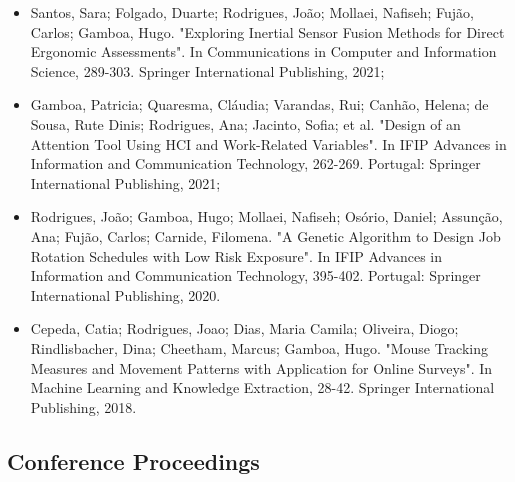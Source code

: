 \begin{itemize}
\item Santos, Sara; Folgado, Duarte; Rodrigues, João; Mollaei, Nafiseh; Fujão, Carlos; Gamboa, Hugo. "Exploring Inertial Sensor Fusion Methods for Direct Ergonomic Assessments". In Communications in Computer and Information Science, 289-303. Springer International Publishing, 2021;

\item Gamboa, Patricia; Quaresma, Cláudia; Varandas, Rui; Canhão, Helena; de Sousa, Rute Dinis; Rodrigues, Ana; Jacinto, Sofia; et al. "Design of an Attention Tool Using HCI and Work-Related Variables". In IFIP Advances in Information and Communication Technology, 262-269. Portugal: Springer International Publishing, 2021;

\item Rodrigues, João; Gamboa, Hugo; Mollaei, Nafiseh; Osório, Daniel; Assunção, Ana; Fujão, Carlos; Carnide, Filomena. "A Genetic Algorithm to Design Job Rotation Schedules with Low Risk Exposure". In IFIP Advances in Information and Communication Technology, 395-402. Portugal: Springer International Publishing, 2020.

\item Cepeda, Catia; Rodrigues, Joao; Dias, Maria Camila; Oliveira, Diogo; Rindlisbacher, Dina; Cheetham, Marcus; Gamboa, Hugo. "Mouse Tracking Measures and Movement Patterns with Application for Online Surveys". In Machine Learning and Knowledge Extraction, 28-42. Springer International Publishing, 2018.

\end{itemize}

\subsection{Conference Proceedings}

